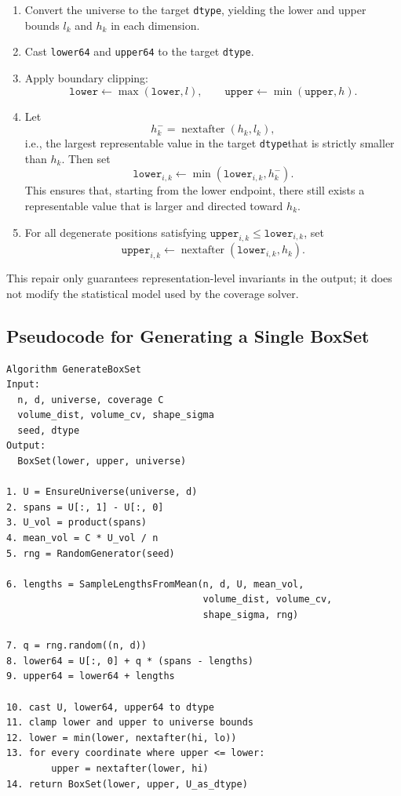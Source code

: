 \documentclass[11pt,a4paper]{article}
\newcommand{\dtype}{\texttt{dtype}}
\newcommand{\code}[1]{\texttt{#1}}
\begin{document}
\begin{enumerate}
  \item Convert the universe to the target \dtype, yielding the lower and upper bounds $l_k$ and $h_k$ in each dimension.
  \item Cast \code{lower64} and \code{upper64} to the target \dtype.
  \item Apply boundary clipping:
  \[
    \code{lower}\leftarrow\max(\code{lower},l),
    \qquad
    \code{upper}\leftarrow\min(\code{upper},h).
  \]
  \item Let
  \[
    h_k^{-}=\operatorname{nextafter}(h_k,l_k),
  \]
  i.e., the largest representable value in the target \dtype that is strictly smaller than $h_k$. Then set
  \[
    \code{lower}_{i,k}\leftarrow
    \min(\code{lower}_{i,k},h_k^{-}).
  \]
  This ensures that, starting from the lower endpoint, there still exists a representable value that is larger and directed toward $h_k$.
  \item For all degenerate positions satisfying $\code{upper}_{i,k}\le\code{lower}_{i,k}$, set
  \[
    \code{upper}_{i,k}
    \leftarrow
    \operatorname{nextafter}(\code{lower}_{i,k},h_k).
  \]
\end{enumerate}

This repair only guarantees representation-level invariants in the output; it does not modify the statistical model used by the coverage solver.

\subsection{Pseudocode for Generating a Single BoxSet}

\begin{verbatim}
Algorithm GenerateBoxSet
Input:
  n, d, universe, coverage C
  volume_dist, volume_cv, shape_sigma
  seed, dtype
Output:
  BoxSet(lower, upper, universe)

1. U = EnsureUniverse(universe, d)
2. spans = U[:, 1] - U[:, 0]
3. U_vol = product(spans)
4. mean_vol = C * U_vol / n
5. rng = RandomGenerator(seed)

6. lengths = SampleLengthsFromMean(n, d, U, mean_vol,
                                   volume_dist, volume_cv,
                                   shape_sigma, rng)

7. q = rng.random((n, d))
8. lower64 = U[:, 0] + q * (spans - lengths)
9. upper64 = lower64 + lengths

10. cast U, lower64, upper64 to dtype
11. clamp lower and upper to universe bounds
12. lower = min(lower, nextafter(hi, lo))
13. for every coordinate where upper <= lower:
        upper = nextafter(lower, hi)
14. return BoxSet(lower, upper, U_as_dtype)
\end{verbatim}
\end{document}
